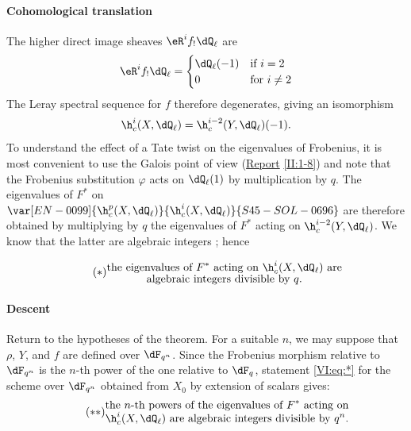 \paragraph{Cohomological translation}
The higher direct image sheaves $\eR^i f_!\dQ_\ell$ are 
\[
  \eR^i f_!\dQ_\ell = \begin{cases}
                       \dQ_\ell(-1) & \text{if $i = 2$} \\
                       0            & \text{for $i\ne 2$}
                     \end{cases}
\]
The Leray spectral sequence for $f$ therefore degenerates, giving an isomorphism 
\[
  \h_c^i(X,\dQ_\ell) = \h_c^{i-2}(Y,\dQ_\ell)(-1) \text{.}
\]
To understand the effect of a Tate twist on the eigenvalues of 
Frobenius, it is most convenient to use the Galois point of view 
(\hyperref[II]{Report} \ref{II:1-8}) and note that the Frobenius substitution 
$\varphi$ acts on $\dQ_\ell(1)$ by multiplication by $q$. The 
eigenvalues of $F^\ast$ on $\var[EN-0099]{\h_c^p(X,\dQ_\ell)}{\h_c^i(X,\dQ_\ell)}{S45-SOL-0696}$ are therefore obtained by 
multiplying by $q$ the eigenvalues of $F^\ast$ acting on $\h_c^{i-2}(Y,\dQ_\ell)$. We 
know that the latter are algebraic integers ; hence 

\begin{equation*}\tag{$*$}\label{VI:eq:*}
  \substack{\displaystyle\text{the eigenvalues of $F^\ast$ acting on $\h_c^i(X,\dQ_\ell)$ are} \\
  \displaystyle\text{algebraic integers divisible by $q$.}}
\end{equation*}


\paragraph{Descent}
Return to the hypotheses of the theorem. For a suitable $n$, we may 
suppose that $\rho$, $Y$, and $f$ are defined over $\dF_{q^n}$. Since the 
Frobenius morphism relative to $\dF_{q^n}$ is the $n$-th power of the one 
relative to $\dF_q$, statement \eqref{VI:eq:*} for the scheme over 
$\dF_{q^n}$ obtained from $X_0$ by extension of scalars gives: 
\begin{equation*}\tag{$**$}\label{VI:eq:**}
  \substack{\displaystyle\text{the $n$-th powers of the eigenvalues of $F^\ast$ acting on} \\ \displaystyle\text{$\h_c^i(X,\dQ_\ell)$ are algebraic integers divisible by $q^n$.}}
\end{equation*}

